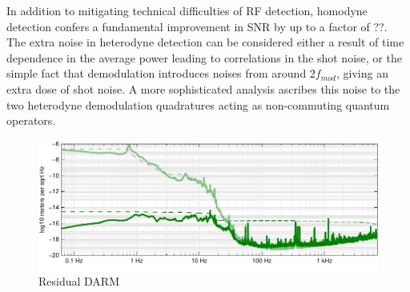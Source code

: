 
In addition to mitigating technical difficulties of RF detection,
homodyne detection confers a fundamental improvement in SNR by up to a
factor of ??. The extra noise in heterodyne detection can be
considered either a result of time dependence in the average power
leading to correlations in the shot
noise\cite{Niebauer1991Nonstationary}, or the simple fact that
demodulation introduces noises from around $2f_{mod}$, giving
an extra dose of shot noise.  A more sophisticated analysis ascribes
this noise to the two heterodyne demodulation quadratures acting as
non-commuting quantum operators\cite{Buonanno2003Quantum}.

\begin{figure}
\centerline{\includegraphics[width=\columnwidth]{figures/residualDARM.pdf}}
\caption{\label{fig:residual-DARM}Residual DARM}
\end{figure}
